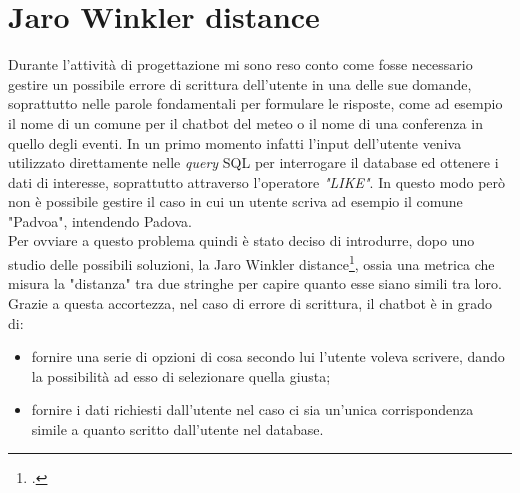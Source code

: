 \section{Jaro Winkler distance}
Durante l'attività di progettazione mi sono reso conto come fosse necessario gestire un possibile errore di scrittura dell'utente in una delle sue domande, soprattutto nelle parole fondamentali per formulare le risposte, come ad esempio il nome di un comune per il \gls{chatbot} del meteo o il nome di una conferenza in quello degli eventi. In un primo momento infatti l'input dell'utente veniva utilizzato direttamente nelle \emph{query} \gls{SQL} per interrogare il database ed ottenere i dati di interesse, soprattutto attraverso l'operatore \emph{"LIKE"}. In questo modo però non è possibile gestire il caso in cui un utente scriva ad esempio il comune "Padvoa", intendendo Padova. \\
Per ovviare a questo problema quindi è stato deciso di introdurre, dopo uno studio delle possibili soluzioni, la Jaro Winkler distance\footcite{jaro}, ossia una metrica che misura la "distanza" tra due stringhe per capire quanto esse siano simili tra loro. Grazie a questa accortezza, nel caso di errore di scrittura, il \gls{chatbot} è in grado di:
\begin{itemize}
	\item fornire una serie di opzioni di cosa secondo lui l'utente voleva scrivere, dando la possibilità ad esso di selezionare quella giusta;
	\item fornire i dati richiesti dall'utente nel caso ci sia un'unica corrispondenza simile a quanto scritto dall'utente nel database.
\end{itemize}
